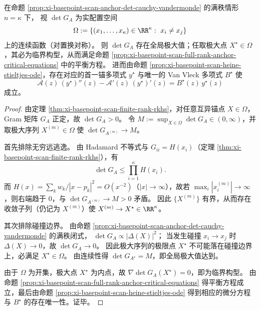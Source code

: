 \begin{proposition}[满秩锚定行列式的全局极大值存在性与临界点必然性]\label{prop:xi-basepoint-scan-anchor-det-global-maximum}
在命题 \ref{prop:xi-basepoint-scan-anchor-det-cauchy-vandermonde} 的满秩情形 \(n=\kappa\) 下，
视 \(\det G_A\) 为实配置空间
\[
\Omega:=\{(x_1,\dots,x_\kappa)\in\RR^\kappa:\ x_i\neq x_j\}
\]
上的连续函数（对置换对称）。
则 \(\det G_A\) 存在全局极大值；任取极大点 \(X^\star\in\Omega\)，其必为临界构型，从而满足命题 \ref{prop:xi-basepoint-scan-full-rank-anchor-critical-equations} 中的平衡方程。
进而由命题 \ref{prop:xi-basepoint-scan-heine-stieltjes-ode}，存在对应的首一锚多项式 \(y^\star\) 与唯一的 Van Vleck 多项式 \(B^\star\) 使
\[
\mathcal{A}(z)\,(y^\star)''(z)-\mathcal{A}'(z)\,(y^\star)'(z)=B^\star(z)\,y^\star(z)
\]
成立。
\end{proposition}
\begin{proof}
由定理 \ref{thm:xi-basepoint-scan-finite-rank-rkhs}，对任意互异锚点 \(X\in\Omega\)，Gram 矩阵 \(G_A\) 正定，故 \(\det G_A>0\)。
令 \(M:=\sup_{X\in\Omega}\det G_A\in(0,\infty)\)，并取极大序列 \(X^{(m)}\in\Omega\) 使 \(\det G_{A^{(m)}}\to M\)。
\par
首先排除无穷远逃逸。
由 Hadamard 不等式与 \(G_{ii}=H(x_i)\)（定理 \ref{thm:xi-basepoint-scan-finite-rank-rkhs}），有
\[
\det G_A\le \prod_{i=1}^{\kappa}H(x_i).
\]
而 \(H(x)=\sum_k w_k/|x-p_k|^2=O(x^{-2})\)（\(|x|\to\infty\)），故若 \(\max_i|x_i^{(m)}|\to\infty\)，则右端趋于 \(0\)，与 \(\det G_{A^{(m)}}\to M>0\) 矛盾。
因此 \(\{X^{(m)}\}\) 有界，从而存在收敛子列（仍记为 \(X^{(m)}\)）使 \(X^{(m)}\to X^\star\in\RR^\kappa\)。
\par
其次排除碰撞边界。
由命题 \ref{prop:xi-basepoint-scan-anchor-det-cauchy-vandermonde} 的满秩闭式，
\(
\det G_A\propto |\Delta(X)|^2
\)；
当发生碰撞 \(x_i\to x_j\) 时 \(\Delta(X)\to 0\)，故 \(\det G_A\to 0\)。
因此极大序列的极限点 \(X^\star\) 不可能落在碰撞边界上，必满足 \(X^\star\in\Omega\)。
由连续性得 \(\det G_{A^\star}=M\)，即全局极大值达到。
\par
由于 \(\Omega\) 为开集，极大点 \(X^\star\) 为内点，故 \(\nabla \det G_A(X^\star)=0\)，即为临界构型。
由命题 \ref{prop:xi-basepoint-scan-full-rank-anchor-critical-equations} 得平衡方程成立，最后由命题 \ref{prop:xi-basepoint-scan-heine-stieltjes-ode} 得到相应的微分方程与 \(B^\star\) 的存在唯一性。证毕。
\end{proof}

